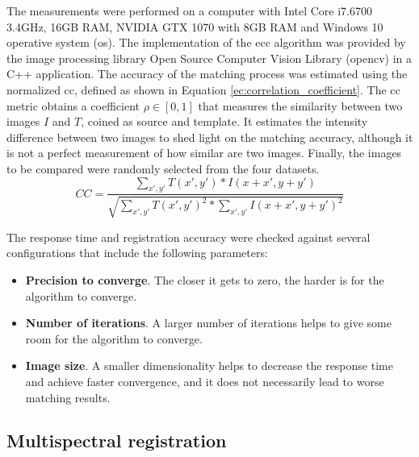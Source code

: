 The measurements were performed on a computer with Intel Core i7.6700 3.4GHz, 16GB RAM, NVIDIA GTX 1070 with 8GB RAM and Windows 10 operative system (\acrshort{os}). The implementation of the \acrshort{ecc} algorithm was provided by the image processing library Open Source Computer Vision Library (\acrshort{opencv}) in a C++ application. The accuracy of the matching process was estimated using the normalized \acrshort{cc}, defined as shown in Equation \ref{ec:correlation_coefficient}. The \acrshort{cc} metric obtains a coefficient $\rho \in [0, 1]$ that measures the similarity between two images $I$ and $T$, coined as source and template. It estimates the intensity difference between two images to shed light on the matching accuracy, although it is not a perfect measurement of how similar are two images. Finally, the images to be compared were randomly selected from the four datasets.
\begin{equation}
    \label{ec:correlation_coefficient}
    \textit{CC} = \frac{\sum_{x',y'} T(x',y') * I(x + x', y + y')}{\sqrt{\sum_{x',y'}T(x',y')^{2} * \sum_{x',y'}I(x + x',y + y')^{2}}}
\end{equation}

The response time and registration accuracy were checked against several configurations that include the following parameters: 
\begin{itemize}
    \item \textbf{Precision to converge}. The closer it gets to zero, the harder is for the algorithm to converge.
    \item \textbf{Number of iterations}. A larger number of iterations helps to give some room for the algorithm to converge. 
    \item \textbf{Image size}. A smaller dimensionality helps to decrease the response time and achieve faster convergence, and it does not necessarily lead to worse matching results. 
\end{itemize}

\subsection{Multispectral registration}

